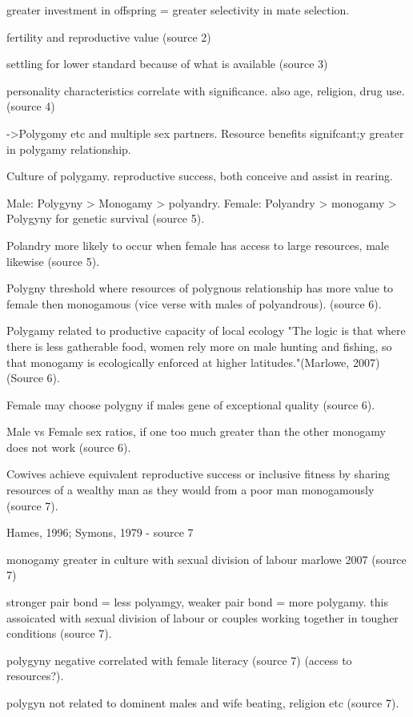 greater investment in offspring = greater selectivity in mate selection.

fertility and reproductive value (source 2)

settling for lower standard because of what is available (source 3)

personality characteristics correlate with significance. also age, religion, drug use. (source 4) 


->Polygomy etc and multiple sex partners.
Resource benefits signifcant;y greater in polygamy relationship.

Culture of polygamy.
reproductive success, both conceive and assist in rearing.

Male: Polygyny > Monogamy > polyandry. Female: Polyandry > monogamy > Polygyny for genetic survival (source 5).

Polandry more likely to occur when female has access to large resources, male likewise (source 5).

Polygny threshold where resources of polygnous relationship has more value to female then monogamous (vice verse with males of polyandrous). (source 6).

Polygamy related to productive capacity of local ecology "The logic is that where there is less gatherable food, women rely more on male hunting and fishing, so that monogamy is ecologically enforced at higher latitudes."(Marlowe, 2007)(Source 6).

Female may choose polygny if males gene of exceptional quality (source 6).

Male vs Female sex ratios, if one too much greater than the other monogamy does not work (source 6).

Cowives achieve equivalent reproductive success or inclusive fitness by sharing resources of a wealthy man as they would from a poor man monogamously (source 7).

Hames, 1996; Symons, 1979 - source 7

monogamy greater in culture with sexual division of labour marlowe 2007 (source 7)

stronger pair bond = less polyamgy, weaker pair bond = more polygamy. this assoicated with sexual division of labour or couples working together in tougher conditions (source 7).

polygyny negative correlated with female literacy (source 7) (access to resources?).

polygyn not related to dominent males and wife beating, religion etc (source 7).

